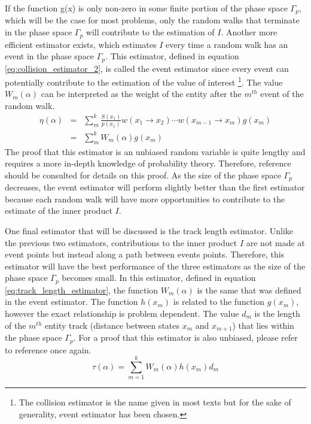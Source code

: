 If the function g(x) is only non-zero in some finite portion of the phase space
$\Gamma_p$, which will be the case for most problems, only the random walks 
that terminate in the phase space $\Gamma_p$ will contribute to the 
estimation of $I$. Another more efficient estimator exists, which estimates $I$
every time a random walk has an event in the phase space $\Gamma_p$. This 
estimator, defined in equation \ref{eq:collision_estimator_2}, is called the 
event estimator since every event can potentially contribute to the estimation 
of the value of interest \footnote{The collision estimator is the name given
in most texts but for the sake of generality, event estimator has been 
chosen.}. The value $W_m(\alpha)$ can be interpreted as the weight of the 
entity after the $m^{th}$ event of the random walk.
\begin{eqnarray}
  \eta(\alpha) & = & \sum_m^k \frac{S(x_1)}{p(x_1)}w(x_1 \to x_2) \cdots 
  w(x_{m-1} \to x_m) g(x_m) \nonumber \\
  & = & \sum_m^k W_m(\alpha) g(x_m)
  \label{eq:collision_estimator_2}
\end{eqnarray}
The proof that this estimator is an unbiased random variable is quite lengthy 
and requires a more in-depth knowledge of probability theory. Therefore, 
reference \cite{spanier_monte_1969} should be consulted for details on this 
proof. As the size of the phase space $\Gamma_p$ decreases, the event estimator 
will perform slightly better than the first estimator because each random walk 
will have more opportunities to contribute to the estimate of the inner product
$I$. 

One final estimator that will be discussed is the track length estimator.
Unlike the previous two estimators, contributions to the inner product $I$
are not made at event points but instead along a path between events points.
Therefore, this estimator will have the best performance of the three
estimators as the size of the phase space $\Gamma_p$ becomes small. In this 
estimator, defined in equation \ref{eq:track_length_estimator}, the function 
$W_m(\alpha)$ is the same that was defined in the event estimator. The function 
$h(x_m)$ is related to the function $g(x_m)$, however the exact relationship is 
problem dependent. The value $d_m$ is the length of the $m^{th}$ entity track 
(distance between states $x_m$ and $x_{m+1}$) that lies within the phase space 
$\Gamma_p$. For a proof that this estimator is also unbiased, please refer to
reference \cite{spanier_monte_1969} once again.
\begin{equation}
  \tau(\alpha) = \sum_{m=1}^k W_m(\alpha)h(x_m)d_m
  \label{eq:track_length_estimator}
\end{equation}


